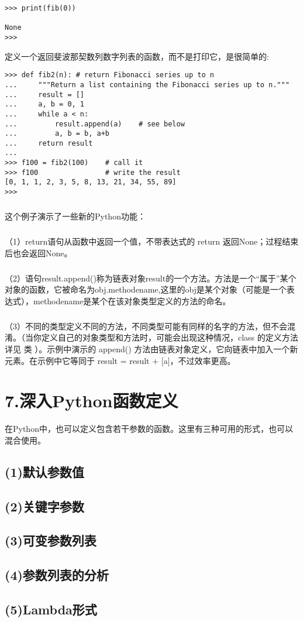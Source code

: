 \documentclass{article}
\begin{document}
\begin{CJK}{UTF8}{gbsn}
\begin{verbatim}
>>> print(fib(0))

None
>>> 
\end{verbatim}
定义一个返回斐波那契数列数字列表的函数，而不是打印它，是很简单的:
\begin{verbatim}
>>> def fib2(n): # return Fibonacci series up to n
...     """Return a list containing the Fibonacci series up to n."""
...     result = []
...     a, b = 0, 1
...     while a < n:
...         result.append(a)    # see below
...         a, b = b, a+b
...     return result
...
>>> f100 = fib2(100)    # call it
>>> f100                # write the result
[0, 1, 1, 2, 3, 5, 8, 13, 21, 34, 55, 89]
>>> 
\end{verbatim}
\subparagraph*{}
这个例子演示了一些新的Python功能：
\subparagraph*{}
（1）return语句从函数中返回一个值，不带表达式的 return 返回None；过程结束后也会返回None。
\subparagraph*{}
（2）语句result.append()称为链表对象result的一个方法。方法是一个“属于”某个对象的函数，它被命名为obj.methodename,这里的obj是某个对象（可能是一个表达式），methodename是某个在该对象类型定义的方法的命名。
\subparagraph*{}
（3）不同的类型定义不同的方法，不同类型可能有同样的名字的方法，但不会混淆。（当你定义自己的对象类型和方法时，可能会出现这种情况，class 的定义方法详见 类 ）。示例中演示的 append() 方法由链表对象定义，它向链表中加入一个新元素。在示例中它等同于 result = result + [a]，不过效率更高。
\section*{7.深入Python函数定义}
在Python中，也可以定义包含若干参数的函数。这里有三种可用的形式，也可以混合使用。
\subsection*{(1)默认参数值}
\subsection*{(2)关键字参数}
\subsection*{(3)可变参数列表}
\subsection*{(4)参数列表的分析}
\subsection*{(5)Lambda形式}

\end{CJK}
\end{document}
